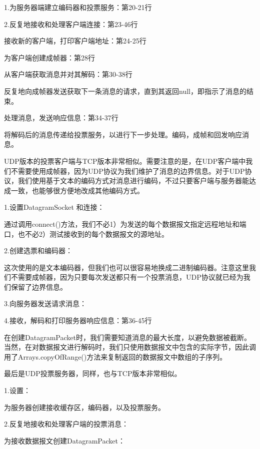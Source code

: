 		

		1.为服务器端建立编码器和投票服务：第20-21行 

		2.反复地接收和处理客户端连接：第23-46行 

		接收新的客户端，打印客户端地址：第24-25行 

		为客户端创建成帧器：第28行 

		从客户端获取消息并对其解码：第30-38行 

		反复地向成帧器发送获取下一条消息的请求，直到其返回null，即指示了消息的结束。 

		处理消息，发送响应信息：第34-37行 

		将解码后的消息传递给投票服务，以进行下一步处理。编码，成帧和回发响应消息。 

		UDP版本的投票客户端与TCP版本非常相似。需要注意的是，在UDP客户端中我们不需要使用成帧器，因为UDP协议为我们维护了消息的边界信息。对于UDP协议，我们使用基于文本的编码方式对消息进行编码，不过只要客户端与服务器能达成一致，也能够很方便地改成其他编码方式。 

		

		1.设置DatagramSocket 和连接：

		通过调用connect()方法，我们不必1）为发送的每个数据报文指定远程地址和端口，也不必2）测试接收到的每个数据报文的源地址。 

		2.创建选票和编码器：

		这次使用的是文本编码器，但我们也可以很容易地换成二进制编码器。注意这里我们不需要成帧器，因为只要每次发送都只有一个投票消息，UDP协议就已经为我们保留了边界信息。 

		3.向服务器发送请求消息：

		4.接收，解码和打印服务器响应信息：第36-45行 

		在创建DatagramPacket时，我们需要知道消息的最大长度，以避免数据被截断。当然，在对数据报文进行解码时，我们只使用数据报文中包含的实际字节，因此调用了Arrays.copyOfRange()方法来复制返回的数据报文中数组的子序列。 

		最后是UDP投票服务器，同样，也与TCP版本非常相似。 

		

		1.设置：

		为服务器创建接收缓存区，编码器，以及投票服务。 

		2.反复地接收和处理客户端的投票消息：

		为接收数据报文创建DatagramPacket：

